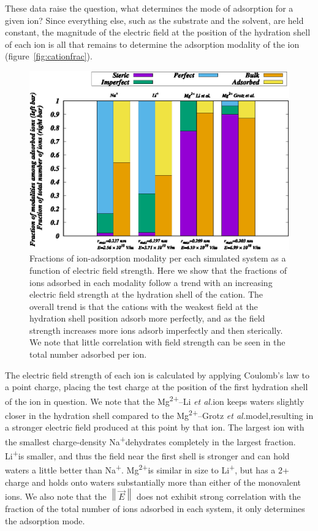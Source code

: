 \documentclass[12pt,openany,final]{book}
\newcommand{\norm}[1]{\left\lVert#1\right\rVert}
\newcommand{\etal}{\textit{et al.}}
\newcommand{\na}{Na\textsuperscript{+}}
\newcommand{\li}{Li\textsuperscript{+}}
\newcommand{\mg}{Mg\textsuperscript{2+}}
\newcommand{\mgmbnbfix}{Mg\textsuperscript{2+}--Li \etal} %
\newcommand{\mgmicro}{Mg\textsuperscript{2+}--Grotz \etal}
\begin{document}
These data raise the question, what determines the mode of adsorption for a given ion? Since everything else, such as
the substrate and the solvent, are held constant, the magnitude of the electric field at the position of the hydration shell
of each ion is all that remains to determine the adsorption modality of the ion (figure~\ref{fig:cationfrac}).
\begin{figure}
    \caption[Ion adsorption modalities]{Fractions of ion-adsorption modality per each simulated system as a function of electric field strength. Here we 
    show that the fractions of ions adsorbed in each modality follow a trend with an increasing electric field strength at the
    hydration shell of the cation. The overall trend is that the cations with the weakest field at the hydration shell position
    adsorb more perfectly, and as the field strength increases more ions adsorb imperfectly and then sterically. We note
    that little correlation with field strength can be seen in the total number adsorbed per ion.}
    \label{fig:cationfrac:ch2}
    \includegraphics{Figure_8_ch2.eps}
\end{figure}
The electric field strength of each ion is calculated by applying Coulomb's law to a point charge, placing the test charge at the 
position of the first hydration shell of the ion in question. We note that the \mgmbnbfix ion keeps waters slightly closer in the hydration shell
compared to the \mgmicro model{,}{resulting in} a stronger electric field 
produced at this point by that ion.
The largest ion with the smallest charge-density \na dehydrates completely in the largest fraction. \li is smaller, and thus the field near
the first shell is stronger and can hold waters a little better than \na. \mg is similar in size to \li, but has a 2+ charge and
holds onto waters substantially more than either of the monovalent ions.  
We also note that the $\norm{\vec{E}}$ does not exhibit strong correlation with the fraction of the total number of ions adsorbed in each system, it
only determines the adsorption mode. 
\end{document}
